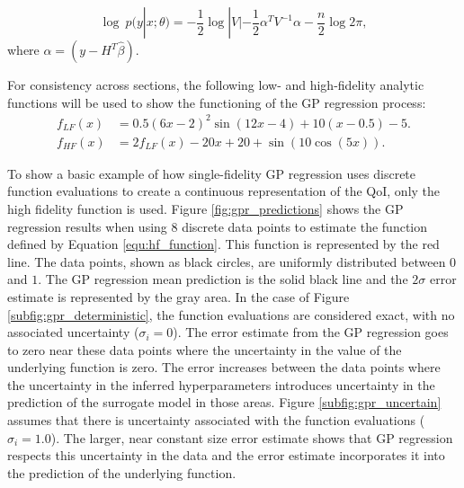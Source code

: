 \begin{equation}
    \log~p(y|x;\theta) = -\frac{1}{2} \log|V| - \frac{1}{2}\alpha^T V^{-1}\alpha - \frac{n}{2}\log 2\pi,
\end{equation}
where $\alpha = \left ( y-H^T\hat{\beta} \right )$.

For consistency across sections, the following low- and high-fidelity analytic functions will be used to show the functioning of the GP regression process: 
\begin{align} \label{equ:lf_function}
    f_{LF}(x) &= 0.5 \left ( 6x - 2\right )^2 \sin{ \left (12x -4 \right )} + 10 \left ( x - 0.5 \right ) -5.
\\ \label{equ:hf_function}
    f_{HF}(x) &= 2 f_{LF}(x) - 20x + 20 + \sin {\left ( 10 \cos{ \left ( 5x \right )}\right )}.
\end{align}

To show a basic example of how single-fidelity GP regression uses discrete function evaluations to create a continuous representation of the QoI, only the high fidelity function is used.
Figure \ref{fig:gpr_predictions} shows the GP regression results when using 8 discrete data points to estimate the function defined by Equation \ref{equ:hf_function}.
This function is represented by the red line. 
The data points, shown as black circles, are uniformly distributed between $0$ and $1$.
The GP regression mean prediction is the solid black line and the $2\sigma$ error estimate is represented by the gray area.
In the case of Figure \ref{subfig:gpr_deterministic}, the function evaluations are considered exact, with no associated uncertainty ($\sigma_i = 0$). 
The error estimate from the GP regression goes to zero near these data points where the uncertainty in the value of the underlying function is zero. 
The error increases between the data points where the uncertainty in the inferred hyperparameters introduces uncertainty in the prediction of the surrogate model in those areas. 
Figure \ref{subfig:gpr_uncertain} assumes that there is uncertainty associated with the function evaluations ($\sigma_i = 1.0$).
The larger, near constant size error estimate shows that GP regression respects this uncertainty in the data and the error estimate incorporates it into the prediction of the underlying function.

